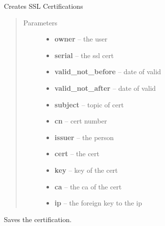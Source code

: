 \documentclass[letterpaper,10pt,english]{sphinxmanual}
\begin{document}
\begin{fulllineitems}
\label{api/web:limeade.web.models.SSLCert}
Creates SSL Certifications
\begin{quote}\begin{description}
\item[{Parameters}] \leavevmode\begin{itemize}
\item {} 
\textbf{owner} -- the user

\item {} 
\textbf{serial} -- the ssl cert

\item {} 
\textbf{valid\_not\_before} -- date of valid

\item {} 
\textbf{valid\_not\_after} -- date of valid

\item {} 
\textbf{subject} -- topic of cert

\item {} 
\textbf{cn} -- cert number

\item {} 
\textbf{issuer} -- the person

\item {} 
\textbf{cert} -- the cert

\item {} 
\textbf{key} -- key of the cert

\item {} 
\textbf{ca} -- the ca of the cert

\item {} 
\textbf{ip} -- the foreign key to the ip

\end{itemize}

\end{description}\end{quote}

\begin{fulllineitems}
\label{api/web:limeade.web.models.SSLCert.set_cert}
Saves the certification.

\end{fulllineitems}


\end{fulllineitems}
\end{document}
